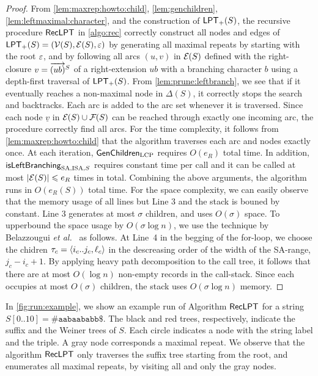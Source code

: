 \documentclass{article}
\begin{document}
\begin{proof}
From
\cref{lem:maxrep:howto:child},
\cref{lem:genchildren},
\cref{lem:leftmaximal:character},
and the construction of $\mathsf{LPT}_{+}(S)$, 
the recursive procedure $\textsf{RecLPT}$ in \cref{algo:rec} correctly construct all nodes and edges of $\mathsf{LPT}_{+}(S) = (\mathcal{V}(S), \mathcal{E}(S), \varepsilon)$ by generating all maximal repeats by starting with the root $\varepsilon$, and by following all arcs $(u, v)$ in $\mathcal{E}_{}(S)$ defined with the right-closure $v = \overrightarrow{(ub)}^{S}$ of a right-extension $ub$ with a branching character $b$ using a depth-first traversal of $\mathsf{LPT}_{+}(S)$.
From \cref{lem:prune:leftbranch}, we see that if it eventually reaches a non-maximal node in $\Delta(S)$, it correctly stops the search and backtracks. Each arc is added to the arc set whenever it is traversed. Since each node $\underline v$ in $\mathcal{E}_{}(S)\cup \mathcal{F}_{}(S)$ can be reached through exactly one incoming arc, the procedure correctly find all arcs.
For the time complexity, it follows from \cref{lem:maxrep:howto:child} that the algorithm traverses each arc and nodes exactly once. At each iteration, $\textsf{GenChildren}_{{\mathrm{LCP}}}$ requires $O(e_R)$ total time. In addition, $\mbox{\textsf{isLeftBranching}}_{{\mathrm{SA}, \mathrm{ISA}, S}}$ requires constant time per call and it can be called at most $|\mathcal{E}(S)| \leqslant e_R$ times in total. Combining the above arguments, the algorithm runs in $O(e_R(S))$ total time.
For the space complexity, we can easily observe that the memory usage of all lines but Line 3 and the stack is bouned by constant. Line 3 generates at most $\sigma$ children, and uses $O(\sigma)$ space. 
To upperbound the space usage by $O(\sigma\log n)$, we use the technique by Belazzougui \textit{et al.}~\cite{belazzougui2020linear} as follows. At Line~4 in the begging of the for-loop, we choose the chidren $\tau_c = \langle i_c..j_c, \ell_c\rangle$ in the descreasing order of the width of the SA-range, $j_c - i_c + 1$. By applying heavy path decomposition to the call tree, it follows that there are at most $O(\log n)$ non-empty records in the call-stack. Since each occupies at most $O(\sigma)$ children, the stack uses $O(\sigma \log n)$ memory. 
\end{proof}

In \cref{fig:run:example}, we show an example run of Algorithm $\textsf{RecLPT}$ for a string $S[0..10] = \mathtt{\#aabaababb\$}$. The black and red trees, respectively, indicate the suffix and the Weiner trees of $S$. Each circle indicates a node with the string label and the triple. A gray node corresponds a maximal repeat. 
We observe that the algorithm $\textsf{RecLPT}$ only traverses the suffix tree starting from the root, and enumerates all maximal repeats, by visiting all and only the gray nodes. 
\end{document}
